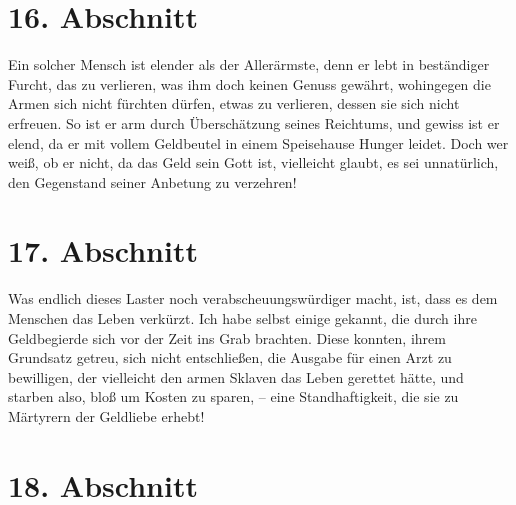 \section{16. Abschnitt} \label{kap13_ab16}

Ein solcher Mensch ist elender als der Allerärmste,
denn er lebt in beständiger
Furcht, das zu verlieren, was ihm doch keinen Genuss gewährt, wohingegen die
Armen sich nicht fürchten dürfen, etwas zu verlieren, dessen sie sich nicht
erfreuen. So ist er arm durch Überschätzung seines Reichtums, und gewiss ist
er elend, da er mit vollem Geldbeutel in einem Speisehause Hunger leidet. Doch
wer weiß, ob er nicht, da das Geld sein Gott ist, vielleicht glaubt, es sei
unnatürlich, den Gegenstand seiner Anbetung zu verzehren!

\section{17. Abschnitt} \label{kap13_ab17}

 Was endlich dieses Laster noch
verabscheuungswürdiger macht, ist, dass es dem
Menschen das Leben verkürzt. Ich habe selbst einige gekannt, die durch ihre
Geldbegierde sich vor der Zeit ins Grab brachten. Diese konnten, ihrem
Grundsatz getreu, sich nicht entschließen, die Ausgabe für einen
Arzt zu
bewilligen, der vielleicht den armen Sklaven das Leben
gerettet hätte, und
starben also, bloß um Kosten zu sparen, -- eine Standhaftigkeit, die sie zu
Märtyrern der Geldliebe erhebt!

\section{18. Abschnitt} \label{kap13_ab18}

